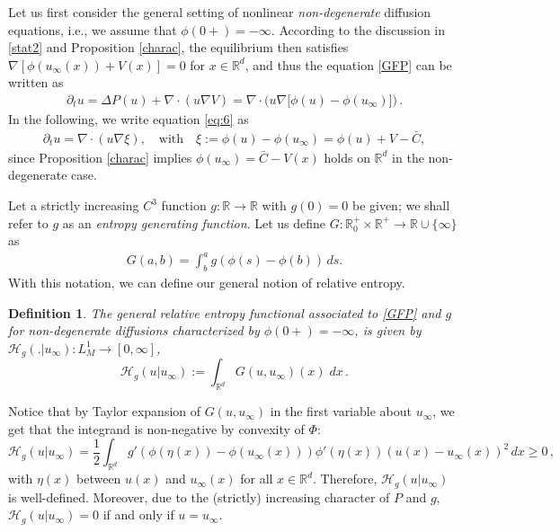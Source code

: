 \documentclass[reqno]{amsart}
\newtheorem{definition}[lemma]{Definition}
\newcommand{\setR}{\mathbb{R}}
\newcommand{\R}{\mathbb{R}}
\newcommand{\Rd}{{\R^d}}
\newcommand{\uinf}{u_\infty}
\begin{document}
Let us first consider the general setting of nonlinear \emph{non-degenerate} diffusion equations, i.e., we assume that $\phi(0+)=-\infty$. According to the discussion in \eqref{stat2} and Proposition \ref{charac}, the equilibrium then satisfies $\nabla [\phi(\uinf(x))+ V(x)]=0$ for $x\in\R^d$, and thus the equation \eqref{GFP} can be written as
\begin{align}
  \label{eq:6}
  \partial_t u = \Delta P(u) + \nabla\cdot(u\nabla V) = \nabla\cdot\big(u\nabla\big[\phi(u)-\phi(u_\infty)\big]\big)\,.
\end{align}
In the following, we write equation \eqref{eq:6} as
\begin{align}
  \label{eq:3}
  \partial_t u = \nabla\cdot(u\nabla\xi) , 
  \quad \text{with} \quad \xi:=\phi(u)-\phi(u_\infty)=\phi(u)+V-\bar C,
\end{align} 
since Proposition \ref{charac} implies $\phi(u_\infty)=\bar C-V(x)$ holds on $\Rd$ in the non-degenerate case.

Let a strictly increasing $C^3$ function $g:\setR\to\setR$ with $g(0)=0$ be given; we shall refer to $g$ as an \emph{entropy generating function}. Let us define $G:\setR^+_0\times\setR^+\to\setR\cup \{\infty\}$ as 
\begin{align}
  \label{eq:7}
   G(a,b) = \int_b^a g(\phi(s)-\phi(b)) \, ds.
\end{align}   
With this notation, we can define our general notion of relative entropy.

\begin{definition}\label{genrelentropy}
The general relative entropy functional associated to \eqref{GFP} and $g$ for non-degenerate diffusions characterized by $\phi(0+)=-\infty$, is given by $\mathcal{H}_g(.|\uinf) :  L^1_M  \to [0,\infty]$,
$$
 \mathcal{H}_g(u|\uinf)  := \int_{\R^d} G(u,\uinf)(x)\;dx\,.
$$
\end{definition}

Notice that by Taylor expansion of $G(u,u_\infty)$ in the first variable about $u_\infty$, we get
that the integrand is non-negative by convexity of $\Phi$:
\begin{equation}\label{Taylorent}
 \mathcal{H}_g(u|u_\infty) = \frac12 \int_{\R^d} g'(\phi(\eta(x))-\phi(\uinf(x))) \phi'(\eta(x)) (u(x)-\uinf(x))^2 \,dx\geq 0\,,
\end{equation}
with $\eta(x)$ between $u(x)$ and $u_\infty(x)$ for all $x\in\R^d$. Therefore, $\mathcal{H}_g(u|u_\infty)$ is well-defined.
Moreover, due to the (strictly) increasing character of $P$ and $g$, $\mathcal{H}_g(u|\uinf)=0$ if and only if $u=\uinf$.
\end{document}
